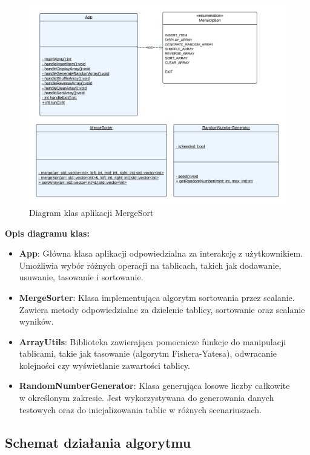 \begin{figure}[!htb]
  \begin{center}
    \includegraphics[width=\textwidth]{rys/uml.png}
    \caption{Diagram klas aplikacji MergeSort}
    \label{rys:uml}
  \end{center}
\end{figure}

\textbf{Opis diagramu klas:}

\begin{itemize}
  \item \textbf{App}: Główna klasa aplikacji odpowiedzialna za interakcję z użytkownikiem. Umożliwia wybór różnych operacji na tablicach, takich jak dodawanie, usuwanie, tasowanie i sortowanie.
  \item \textbf{MergeSorter}: Klasa implementująca algorytm sortowania przez scalanie. Zawiera metody odpowiedzialne za dzielenie tablicy, sortowanie oraz scalanie wyników.
  \item \textbf{ArrayUtils}: Biblioteka zawierająca pomocnicze funkcje do manipulacji tablicami, takie jak tasowanie (algorytm Fishera-Yatesa), odwracanie kolejności czy wyświetlanie zawartości tablicy.
  \item \textbf{RandomNumberGenerator}: Klasa generująca losowe liczby całkowite \\ w określonym zakresie. Jest wykorzystywana do generowania danych testowych oraz do inicjalizowania tablic w różnych scenariuszach.
\end{itemize}

\subsection{Schemat działania algorytmu}

